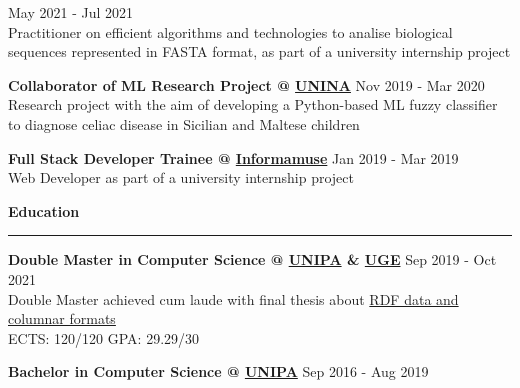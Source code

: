 \documentclass[11pt,letterpaper]{article}
\begin{document}
\begin{justify}
\begin{itemize}[label={}, leftmargin=0pt]
\begin{item}
		      \hfill
		      May 2021 - Jul 2021
		      \vspace{0.05cm}
		      \\
		      Practitioner on efficient algorithms and technologies to analise biological sequences represented in FASTA format, as part of a university internship project
		\end{item}
		\begin{item}
		      \textbf{Collaborator of ML Research Project @ \href{https://www.unina.it/en_GB}{UNINA}}
		      \hfill
		      Nov 2019 - Mar 2020
		      \vspace{0.05cm}
		      \\
		      Research project with the aim of developing a Python-based ML fuzzy classifier to diagnose celiac disease in Sicilian and Maltese children
		\end{item}
		\begin{item}
		      \textbf{Full Stack Developer Trainee @ \href{https://www.informamuse.com/en/home/}{Informamuse}}
		      \hfill
		      Jan 2019 - Mar 2019
		      \vspace{0.05cm}
		      \\
		      Web Developer as part of a university internship project
		\end{item}
	\end{itemize}
	\vspace{0.1cm}
	{\large \textbf{Education} \strut}
	\hrule
	\begin{itemize}[label={}, leftmargin=0pt]
		\begin{item}
		      \textbf{Double Master in Computer Science @ \href{https://www.unipa.it/mobilita/en/}{UNIPA} \& \href{https://www.univ-gustave-eiffel.fr/en/}{UGE}}
		      \hfill
		      Sep 2019 - Oct 2021
		      \vspace{0.05cm}
		      \\
		      Double Master achieved cum laude with final thesis about \href{https://raw.githubusercontent.com/dariocurr/thesis/main/thesis.pdf}{RDF data and columnar formats}
		      \\
		      ECTS: 120/120 \hspace{0.33cm} GPA: 29.29/30
		\end{item}
		\begin{item}
		      \textbf{Bachelor in Computer Science @ \href{https://www.unipa.it/mobilita/en/}{UNIPA}}
		      \hfill
		      Sep 2016 - Aug 2019
		      \vspace{0.05cm}
		      \\

\end{item}
\end{itemize}
\end{justify}
\end{document}
